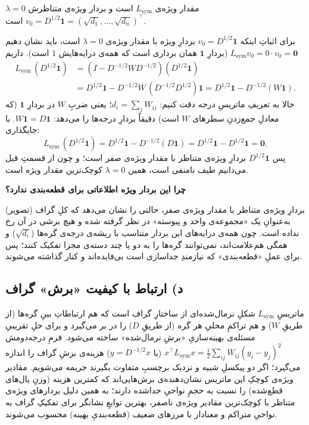 \documentclass[14pt]{extarticle}
\newcommand{\T}{^{\top}}
\begin{document}
\begin{claimx}
$\lambda=0$ مقدار ویژه‌ی $L_{\mathrm{sym}}$ است و بردار ویژه‌ی متناظرش
$v_0=D^{1/2}\mathbf{1}=(\sqrt{d_1},\dots,\sqrt{d_n})\T$ است.
\end{claimx}

\begin{proofx}
برای اثباتِ اینکه $v_0=D^{1/2}\mathbf{1}$ بردارِ ویژه با مقدار ویژه‌ی $\lambda=0$ است، باید نشان دهیم $L_{\mathrm{sym}}v_0=0\cdot v_0=\mathbf 0$ (بردارِ $\mathbf 1$ همان برداری است که همه‌ی درایه‌هایش $1$ است). داریم
\begin{align*}
L_{\mathrm{sym}}\,(D^{1/2}\mathbf{1})
&=(I-D^{-1/2}W D^{-1/2})(D^{1/2}\mathbf{1})\\
&=D^{1/2}\mathbf{1}-D^{-1/2}W\,(D^{-1/2}D^{1/2})\mathbf{1}
=D^{1/2}\mathbf{1}-D^{-1/2}(W\mathbf{1}).
\end{align*}
حالا به تعریفِ ماتریسِ درجه دقت کنیم: $d_i=\sum_j W_{ij}$؛ یعنی ضربِ $W$ در بردارِ $\mathbf 1$ (که معادلِ جمع‌زدنِ سطرهای $W$ است) دقیقاً بردارِ درجه‌ها را می‌دهد: $W\mathbf{1}=D\mathbf{1}$. با جایگذاری:
\[
L_{\mathrm{sym}}\,(D^{1/2}\mathbf{1})
=D^{1/2}\mathbf{1}-D^{-1/2}(D\mathbf{1})
=D^{1/2}\mathbf{1}-D^{1/2}\mathbf{1}=\mathbf{0}.
\]
پس $D^{1/2}\mathbf 1$ بردارِ ویژه‌ی متناظر با مقدار ویژه‌ی صفر است؛ و چون از قسمتِ قبل می‌دانیم طیف نامنفی است، همین $\lambda=0$ کوچک‌ترین مقدار ویژه است.
\end{proofx}

\noindent\textbf{چرا این بردار ویژه اطلاعاتی برای قطعه‌بندی ندارد؟}

بردارِ ویژه‌ی متناظر با مقدار ویژه‌ی صفر، حالتی را نشان می‌دهد که کلِ گراف (تصویر) به‌عنوانِ یک «مجموعه‌ی واحد و پیوسته» در نظر گرفته شده و هیچ برشی در آن رخ نداده است. چون همه‌ی درایه‌های این بردار متناسب با ریشه‌ی درجه‌ی گره‌ها ($\sqrt{d_i}$) و همگی هم‌علامت‌اند، نمی‌توانند گره‌ها را به دو یا چند دسته‌ی مجزا تفکیک کنند؛ پس برای عملِ «قطعه‌بندی» که نیازمندِ جداسازی است بی‌فایده‌اند و کنار گذاشته می‌شوند.

\subsection{د) ارتباط با کیفیت «برش» گراف}

ماتریسِ $L_{\mathrm{sym}}$ شکلِ نرمال‌شده‌ای از ساختارِ گراف است که هم ارتباطاتِ بینِ گره‌ها (از طریقِ $W$) و هم تراکمِ محلیِ هر گره (از طریقِ $D$) را در بر می‌گیرد و برای حلِ تقریبیِ مسئله‌ی بهینه‌سازیِ «برشِ نرمال‌شده» ساخته می‌شود. فرمِ درجه‌دومش
$x\T L_{\mathrm{sym}}x=\tfrac12\sum_{ij}W_{ij}(y_i-y_j)^2$ (با $y=D^{-1/2}x$) هزینه‌ی برشِ گراف را اندازه می‌گیرد؛ اگر دو پیکسلِ شبیه و نزدیک برچسبِ متفاوت بگیرند جریمه می‌شویم. مقادیر ویژه‌ی کوچکِ این ماتریس نشان‌دهنده‌ی برش‌هایی‌اند که کمترین هزینه (وزنِ یال‌های قطع‌شده) را نسبت به حجمِ نواحیِ جداشده دارند؛ به همین دلیل بردارهای ویژه‌ی متناظر با کوچک‌ترین مقادیر ویژه‌ی ناصفر، بهترین توابعِ نشانگر برای تفکیکِ گراف به نواحیِ متراکم و معنادار با مرزهای ضعیف (قطعه‌بندیِ بهینه) محسوب می‌شوند.
\end{document}
